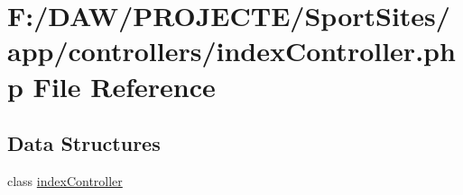 \hypertarget{index_controller_8php}{}\section{F\+:/\+D\+A\+W/\+P\+R\+O\+J\+E\+C\+T\+E/\+Sport\+Sites/app/controllers/index\+Controller.php File Reference}
\label{index_controller_8php}
\subsection*{Data Structures}
\begin{DoxyCompactItemize}
\item 
class \hyperlink{classindex_controller}{index\+Controller}
\end{DoxyCompactItemize}
